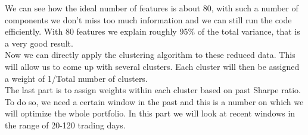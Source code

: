 We can see how the ideal number of features is about 80, with such a number of components we don't miss too much information and we can still run the code efficiently. With 80 features we explain roughly 95\% of the total variance, that is a very good result.\\
Now we can directly apply the clustering algorithm to these reduced data. This will allow us to come up with several clusters. Each cluster will then be assigned a weight of 1/Total number of clusters.\\
The last part is to assign weights within each cluster based on past Sharpe ratio. To do so, we need a certain window in the past and this is a number on which we will optimize the whole portfolio. In this part we will look at recent windows in the range of 20-120 trading days.\\ 

